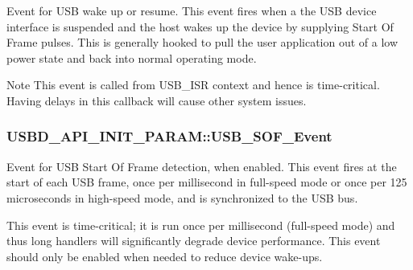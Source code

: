 Event for U\-S\-B wake up or resume. This event fires when a the U\-S\-B device interface is suspended and the host wakes up the device by supplying Start Of Frame pulses. This is generally hooked to pull the user application out of a low power state and back into normal operating mode. \par
\begin{DoxyNote}{Note}
This event is called from U\-S\-B\-\_\-\-I\-S\-R context and hence is time-\/critical. Having delays in this callback will cause other system issues. 
\end{DoxyNote}
\hypertarget{structUSBD__API__INIT__PARAM_af6f224a6b2ddee3c5b2056a62fa84914}{
\subsubsection[{U\-S\-B\-\_\-\-S\-O\-F\-\_\-\-Event}]{ U\-S\-B\-D\-\_\-\-A\-P\-I\-\_\-\-I\-N\-I\-T\-\_\-\-P\-A\-R\-A\-M\-::\-U\-S\-B\-\_\-\-S\-O\-F\-\_\-\-Event}}\label{structUSBD__API__INIT__PARAM_af6f224a6b2ddee3c5b2056a62fa84914}
Event for U\-S\-B Start Of Frame detection, when enabled. This event fires at the start of each U\-S\-B frame, once per millisecond in full-\/speed mode or once per 125 microseconds in high-\/speed mode, and is synchronized to the U\-S\-B bus.

This event is time-\/critical; it is run once per millisecond (full-\/speed mode) and thus long handlers will significantly degrade device performance. This event should only be enabled when needed to reduce device wake-\/ups.

